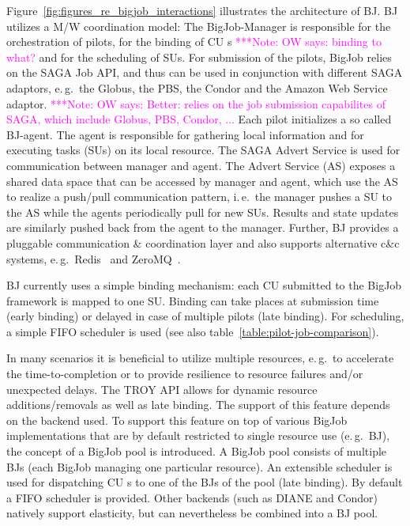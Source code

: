 \documentclass[conference,final]{IEEEtran}
\newcommand{\note}[1]{ {\textcolor{magenta} { ***Note: #1 }}}
\newcommand{\note}[1]{}
\newcommand{\cu}{CU\xspace}
\begin{document}
Figure~\ref{fig:figures_re_bigjob_interactions} illustrates the architecture of
BJ. BJ utilizes a M/W coordination model: The BigJob-Manager is responsible for
the orchestration of pilots, for the binding of \cu s \note{OW says: binding to what?}
and for the scheduling of
SUs. For submission of the pilots, BigJob relies on the SAGA Job API, and thus can
be used in conjunction with different SAGA adaptors, e.\,g.\ the Globus, the
PBS, the Condor and the Amazon Web Service adaptor. 
\note{OW says: Better: relies on the job submission capabilites of SAGA, which include
Globus, PBS, Condor, ...}
Each pilot initializes a so
called BJ-agent. The agent is responsible for gathering local information
and for executing tasks (SUs) on its local resource. The SAGA Advert Service
is used for communication between manager and agent. The Advert Service (AS)
exposes a shared data space that can be accessed by manager and agent, which use
the AS to realize a push/pull communication pattern, i.\,e.\ the manager pushes
a SU to the AS while the agents periodically pull for new SUs. Results and state
updates are similarly pushed back from the agent to the manager. Further, BJ
provides a pluggable communication \& coordination layer and also supports
alternative c\&c systems, e.\,g.\ Redis~\cite{redis} and ZeroMQ~\cite{zmq}.

BJ currently uses a simple binding mechanism: each \cu  submitted to the BigJob
framework is mapped to one SU. Binding can take places at submission
time (early binding) or delayed in case of multiple pilots (late binding). 
For scheduling, a simple FIFO scheduler is used (see also
table~\ref{table:pilot-job-comparison}).




In many scenarios it is beneficial to utilize multiple resources, e.\,g.\ to
accelerate the time-to-completion or to provide resilience to resource failures
and/or unexpected delays. The TROY API allows for dynamic resource
additions/removals as well as late binding. The support of this feature depends
on the backend used. To support this feature on top of various BigJob
implementations that are by default restricted to single resource use (e.\,g.\
BJ), the concept of a BigJob pool is introduced. A BigJob pool consists of
multiple BJs (each BigJob managing one particular resource). An extensible
scheduler is used for dispatching \cu s to one of the BJs of the pool (late
binding). By default a FIFO scheduler is provided. Other backends (such as DIANE
and Condor) natively support elasticity, but can nevertheless be combined into a
BJ pool.
\end{document}
